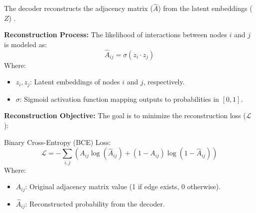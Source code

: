 \documentclass{article}
\newcounter{subsubsubsection}[subsubsection]
\begin{document}

The decoder reconstructs the adjacency matrix (\(\hat{A}\)) from the latent embeddings (\(Z\)) \cite{decoder}.

\textbf{Reconstruction Process:}  
The likelihood of interactions between nodes \(i\) and \(j\) is modeled as:
\[
\hat{A}_{ij} = \sigma(z_i \cdot z_j)
\]
Where:
\begin{itemize}
    \item \(z_i, z_j\): Latent embeddings of nodes \(i\) and \(j\), respectively.
    \item \(\sigma\): Sigmoid activation function mapping outputs to probabilities in \([0, 1]\).
\end{itemize}

\textbf{Reconstruction Objective:}  
The goal is to minimize the reconstruction loss (\(\mathcal{L}\)):

Binary Cross-Entropy (BCE) Loss:
\[
\mathcal{L} = - \sum_{i,j} \left( A_{ij} \log(\hat{A}_{ij}) + (1 - A_{ij}) \log(1 - \hat{A}_{ij}) \right)
\]
Where:
\begin{itemize}
    \item \(A_{ij}\): Original adjacency matrix value (1 if edge exists, 0 otherwise).
    \item \(\hat{A}_{ij}\): Reconstructed probability from the decoder.
\end{itemize}

\vspace{0.2cm} %

\end{document}
